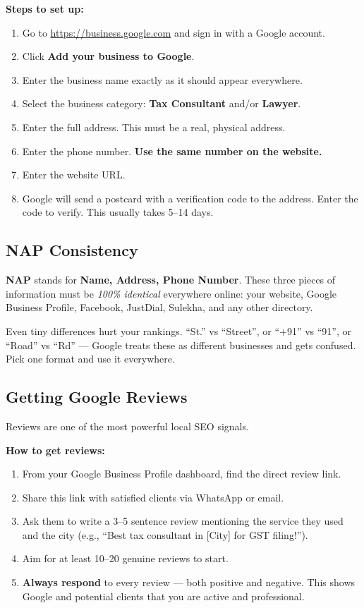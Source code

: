 \documentclass[12pt, a4paper]{book}
\begin{document}
\textbf{Steps to set up:}
\begin{enumerate}[leftmargin=1.5em]
  \item Go to \url{https://business.google.com} and sign in with a Google account.
  \item Click \textbf{Add your business to Google}.
  \item Enter the business name exactly as it should appear everywhere.
  \item Select the business category: \textbf{Tax Consultant} and/or \textbf{Lawyer}.
  \item Enter the full address. This must be a real, physical address.
  \item Enter the phone number. \textbf{Use the same number on the website.}
  \item Enter the website URL.
  \item Google will send a postcard with a verification code to the address.
        Enter the code to verify. This usually takes 5--14 days.
\end{enumerate}

\subsection{NAP Consistency}

\textbf{NAP} stands for \textbf{Name, Address, Phone Number}.
These three pieces of information must be \emph{100\% identical} everywhere online:
your website, Google Business Profile, Facebook, JustDial, Sulekha, and any other directory.

\begin{tcolorbox}[warnbox]
Even tiny differences hurt your rankings. ``St.'' vs ``Street'',
or ``+91'' vs ``91'', or ``Road'' vs ``Rd'' --- Google treats these
as different businesses and gets confused. Pick one format and use it everywhere.
\end{tcolorbox}

\subsection{Getting Google Reviews}

Reviews are one of the most powerful local SEO signals.

\textbf{How to get reviews:}
\begin{enumerate}[leftmargin=1.5em]
  \item From your Google Business Profile dashboard, find the direct review link.
  \item Share this link with satisfied clients via WhatsApp or email.
  \item Ask them to write a 3--5 sentence review mentioning the service they used
        and the city (e.g., ``Best tax consultant in [City] for GST filing!'').
  \item Aim for at least 10--20 genuine reviews to start.
  \item \textbf{Always respond} to every review --- both positive and negative.
        This shows Google and potential clients that you are active and professional.
\end{enumerate}
\end{document}
